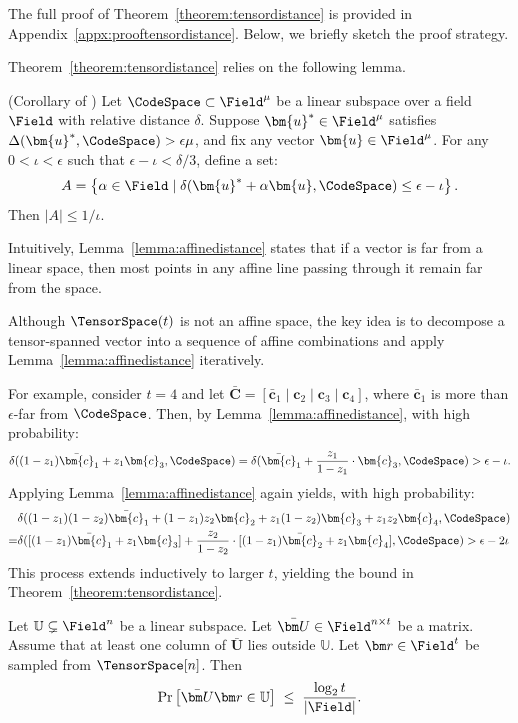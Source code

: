 The full proof of Theorem~\ref{theorem:tensordistance} is provided in Appendix~\ref{appx:prooftensordistance}.
Below, we briefly sketch the proof strategy.

Theorem~\ref{theorem:tensordistance} relies on the following lemma.
\begin{lemma}
\label{lemma:affinedistance}
{\normalfont (Corollary of \cite[Lemma~4.2]{ccc/Ben-SassonKS18})}
Let $\CodeSpace \subset \Field^\mu$ be a linear subspace over a field $\Field$ with relative distance $\delta$. Suppose $\bm{u}^* \in \Field^\mu$ satisfies $\Delta(\bm{u}^*, \CodeSpace) > \epsilon \mu$, and fix any vector $\bm{u} \in \Field^\mu$. For any $0 < \iota < \epsilon$ such that $\epsilon - \iota < \delta/3$, define a set:
\[
    A = \left\{ \alpha \in \Field \mid \delta(\bm{u}^* + \alpha \bm{u}, \CodeSpace) \le \epsilon - \iota \right\}.
\]
Then $|A| \leq 1/\iota$.
\end{lemma}

Intuitively, Lemma~\ref{lemma:affinedistance} states that if a vector is far from a
linear space, then most points in any affine line passing through it remain far
from the space.

Although $\TensorSpace(t)$ is not an affine space, the key idea is to decompose a
tensor-spanned vector into a sequence of affine combinations and apply
Lemma~\ref{lemma:affinedistance} iteratively.

For example, consider $t=4$ and let
$\bar{\bm{C}} = [\bar{\bm{c}}_1\mid \bm{c}_2 \mid \bm{c}_3\mid \bm{c}_4]$, where
$\bar{\bm{c}}_1$ is more than $\epsilon$-far from $\CodeSpace$.
Then, by Lemma~\ref{lemma:affinedistance}, with high probability:
\[
    \delta((1-z_1)\bar{\bm{c}}_1 + z_1 \bm{c}_3, \CodeSpace)
    = \delta(\bar{\bm{c}}_1 + \frac{z_1}{1-z_1} \cdot \bm{c}_3, \CodeSpace)
    > \epsilon - \iota.
\]
Applying Lemma~\ref{lemma:affinedistance} again yields, with high probability:
\begin{align*}
    & \delta((1-z_1)(1-z_2)\bar{\bm{c}}_1 +(1-z_1) z_2 \bm{c}_2 + z_1 (1-z_2) \bm{c}_3 + z_1z_2 \bm{c}_4, \CodeSpace)
    \\
    = &
    \delta([(1-z_1)\bar{\bm{c}}_1 + z_1 \bm{c}_3] + \frac{z_2}{1-z_2} \cdot [ (1-z_1)\bar{\bm{c}}_2 + z_1 \bm{c}_4], \CodeSpace)
    > \epsilon - 2\iota
\end{align*}
This process extends inductively to larger $t$,
yielding the bound in
Theorem~\ref{theorem:tensordistance}.


\iffalse
\begin{lemma}
\label{lemma:tensorcombspace}
Let $\mathbb U \subsetneq \Field^n$ be a linear subspace.
Let $\bar{\bm U} \in \Field^{n\times t}$ be a matrix.
Assume that at least one column of $\bar{\bm U}$ lies outside $\mathbb U$.
Let $\bm r \in \Field^t$ be sampled from $\TensorSpace[n]$.
Then
\[
\Pr\big[ \bar{\bm U}\bm r \in \mathbb U \big]
\;\le\;
\frac{\log_2 t}{|\Field|}.
\]
\end{lemma}


